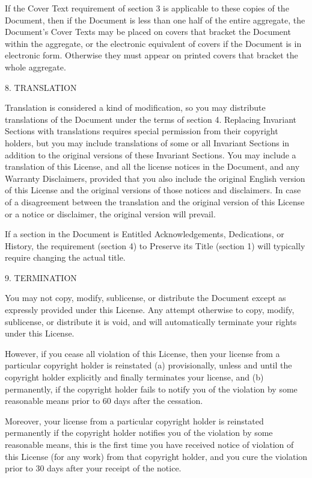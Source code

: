 If the Cover Text requirement of section 3 is applicable to these
copies of the Document, then if the Document is less than one half
of the entire aggregate, the Document's Cover Texts may be placed
on covers that bracket the Document within the aggregate, or the electronic
equivalent of covers if the Document is in electronic form. Otherwise
they must appear on printed covers that bracket the whole aggregate.

8. TRANSLATION

Translation is considered a kind of modification, so you may distribute
translations of the Document under the terms of section 4. Replacing
Invariant Sections with translations requires special permission from
their copyright holders, but you may include translations of some
or all Invariant Sections in addition to the original versions of
these Invariant Sections. You may include a translation of this License,
and all the license notices in the Document, and any Warranty Disclaimers,
provided that you also include the original English version of this
License and the original versions of those notices and disclaimers.
In case of a disagreement between the translation and the original
version of this License or a notice or disclaimer, the original version
will prevail.

If a section in the Document is Entitled \textquotedbl{}Acknowledgements\textquotedbl{},
\textquotedbl{}Dedications\textquotedbl{}, or \textquotedbl{}History\textquotedbl{},
the requirement (section 4) to Preserve its Title (section 1) will
typically require changing the actual title.

9. TERMINATION

You may not copy, modify, sublicense, or distribute the Document except
as expressly provided under this License. Any attempt otherwise to
copy, modify, sublicense, or distribute it is void, and will automatically
terminate your rights under this License.

However, if you cease all violation of this License, then your license
from a particular copyright holder is reinstated (a) provisionally,
unless and until the copyright holder explicitly and finally terminates
your license, and (b) permanently, if the copyright holder fails to
notify you of the violation by some reasonable means prior to 60 days
after the cessation.

Moreover, your license from a particular copyright holder is reinstated
permanently if the copyright holder notifies you of the violation
by some reasonable means, this is the first time you have received
notice of violation of this License (for any work) from that copyright
holder, and you cure the violation prior to 30 days after your receipt
of the notice.

